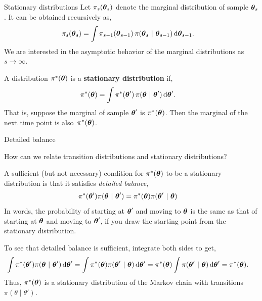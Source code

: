 \documentclass[aspectratio=169]{beamer}
\begin{document}
\begin{frame}{Stationary distributions}
Let $\pi_s(\boldsymbol{\theta}_s)$ denote the marginal distribution of sample $\boldsymbol{\theta}_s$. It can be obtained recursively as,
\begin{align}
    \pi_s(\boldsymbol{\theta}_s) &= \int \pi_{s-1}(\boldsymbol{\theta}_{s-1}) \, \pi(\boldsymbol{\theta}_s ~\vert~ \boldsymbol{\theta}_{s-1}) \mathop{}\!\mathrm{d} \boldsymbol{\theta}_{s-1}.
\end{align}
We are interested in the asymptotic behavior of the marginal distributions as $s \to \infty$.

A distribution $\pi^*(\boldsymbol{\theta})$ is a \textbf{stationary distribution} if,
\begin{align}
    \pi^*(\boldsymbol{\theta}) &= \int \pi^*(\boldsymbol{\theta}') \, \pi(\boldsymbol{\theta} ~\vert~ \boldsymbol{\theta}') \mathop{}\!\mathrm{d} \boldsymbol{\theta}'.
\end{align}
That is, suppose the marginal of sample $\boldsymbol{\theta}'$ is $\pi^*(\boldsymbol{\theta})$. Then the marginal of the next time point is also~$\pi^*(\boldsymbol{\theta})$.
\end{frame}

\begin{frame}{Detailed balance}
    

How can we relate transition distributions and stationary distributions?

A sufficient (but not necessary) condition for $\pi^*(\boldsymbol{\theta})$ to be a stationary distribution is that it satisfies \textit{detailed balance},
\begin{align}
    \pi^*(\boldsymbol{\theta}') \pi(\boldsymbol{\theta} ~\vert~ \boldsymbol{\theta}') &=
    \pi^*(\boldsymbol{\theta}) \pi(\boldsymbol{\theta}' ~\vert~ \boldsymbol{\theta}) 
\end{align}
In words, the probability of starting at $\boldsymbol{\theta}'$ and moving to $\boldsymbol{\theta}$ is the same as that of starting at $\boldsymbol{\theta}$ and moving to $\boldsymbol{\theta}'$, if you draw the starting point from the stationary distribution.

To see that detailed balance is sufficient, integrate both sides to get,
\begin{align}
    \int \pi^*(\boldsymbol{\theta}') \pi(\boldsymbol{\theta} ~\vert~ \boldsymbol{\theta}') \mathop{}\!\mathrm{d} \boldsymbol{\theta}'
    &=
    \int \pi^*(\boldsymbol{\theta}) \pi(\boldsymbol{\theta}' ~\vert~ \boldsymbol{\theta}) \mathop{}\!\mathrm{d} \boldsymbol{\theta}'
    =
    \pi^*(\boldsymbol{\theta}) \int \pi(\boldsymbol{\theta}' ~\vert~ \boldsymbol{\theta}) \mathop{}\!\mathrm{d} \boldsymbol{\theta}'
    = \pi^*(\boldsymbol{\theta}).
\end{align}
Thus, $\pi^*(\boldsymbol{\theta})$ is a stationary distribution of the Markov chain with transitions $\pi(\theta \mid \theta')$.

\end{frame}
\end{document}
